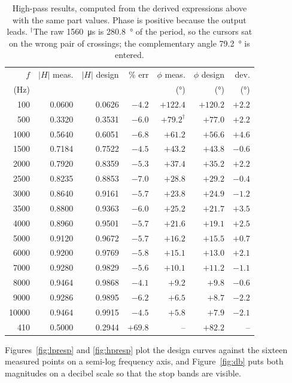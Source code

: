 \documentclass[11pt]{article}
\begin{document}
\begin{table}[H]
    \centering\footnotesize
    \caption{High-pass results, computed from the derived expressions above with
    the same part values. Phase is positive because the output leads.
    $^{\dagger}$The raw \qty{1560}{\micro\second} is \qty{280.8}{\degree} of the
    period, so the cursors sat on the wrong pair of crossings; the complementary
    angle \qty{79.2}{\degree} is entered.}
    \label{tab:reshp}
    \begin{tabular}{r rrr rrr}
        \toprule
        $f$ & $|H|$ meas. & $|H|$ design & \% err &
        $\phi$ meas. & $\phi$ design & dev. \\
        (\unit{\hertz}) & & & & (\unit{\degree}) & (\unit{\degree}) & (\unit{\degree}) \\
        \midrule
          100 & 0.0600 & 0.0626 & $-4.2$ & $+122.4$ & $+120.2$ & $+2.2$ \\
          500 & 0.3320 & 0.3531 & $-6.0$ & $+79.2^{\dagger}$ & $+77.0$ & $+2.2$ \\
         1000 & 0.5640 & 0.6051 & $-6.8$ & $+61.2$ & $+56.6$ & $+4.6$ \\
         1500 & 0.7184 & 0.7522 & $-4.5$ & $+43.2$ & $+43.8$ & $-0.6$ \\
         2000 & 0.7920 & 0.8359 & $-5.3$ & $+37.4$ & $+35.2$ & $+2.2$ \\
         2500 & 0.8235 & 0.8853 & $-7.0$ & $+28.8$ & $+29.2$ & $-0.4$ \\
         3000 & 0.8640 & 0.9161 & $-5.7$ & $+23.8$ & $+24.9$ & $-1.2$ \\
         3500 & 0.8800 & 0.9363 & $-6.0$ & $+25.2$ & $+21.7$ & $+3.5$ \\
         4000 & 0.8960 & 0.9501 & $-5.7$ & $+21.6$ & $+19.1$ & $+2.5$ \\
         5000 & 0.9120 & 0.9672 & $-5.7$ & $+16.2$ & $+15.5$ & $+0.7$ \\
         6000 & 0.9200 & 0.9769 & $-5.8$ & $+15.1$ & $+13.0$ & $+2.1$ \\
         7000 & 0.9280 & 0.9829 & $-5.6$ & $+10.1$ & $+11.2$ & $-1.1$ \\
         8000 & 0.9464 & 0.9868 & $-4.1$ & $+9.2$ & $+9.8$ & $-0.6$ \\
         9000 & 0.9286 & 0.9895 & $-6.2$ & $+6.5$ & $+8.7$ & $-2.2$ \\
        10000 & 0.9464 & 0.9915 & $-4.5$ & $+5.8$ & $+7.9$ & $-2.1$ \\
        \midrule
          410 & 0.5000 & 0.2944 & $+69.8$ & -- & $+82.2$ & -- \\
        \bottomrule
    \end{tabular}
\end{table}
Figures~\ref{fig:lpresp} and \ref{fig:hpresp} plot the design curves against the
sixteen measured points on a semi-log frequency axis, and Figure~\ref{fig:db}
puts both magnitudes on a decibel scale so that the stop bands are visible.
\end{document}
